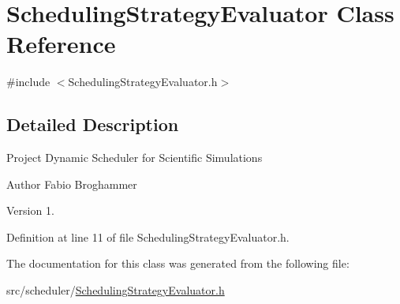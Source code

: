 \hypertarget{class_scheduling_strategy_evaluator}{}\section{Scheduling\+Strategy\+Evaluator Class Reference}
\label{class_scheduling_strategy_evaluator}


{\ttfamily \#include $<$Scheduling\+Strategy\+Evaluator.\+h$>$}



\subsection{Detailed Description}
Project Dynamic Scheduler for Scientific Simulations \begin{DoxyAuthor}{Author}
Fabio Broghammer 
\end{DoxyAuthor}
\begin{DoxyVersion}{Version}
1. 
\end{DoxyVersion}


Definition at line 11 of file Scheduling\+Strategy\+Evaluator.\+h.



The documentation for this class was generated from the following file\+:\begin{DoxyCompactItemize}
\item 
src/scheduler/\hyperlink{_scheduling_strategy_evaluator_8h}{Scheduling\+Strategy\+Evaluator.\+h}\end{DoxyCompactItemize}

